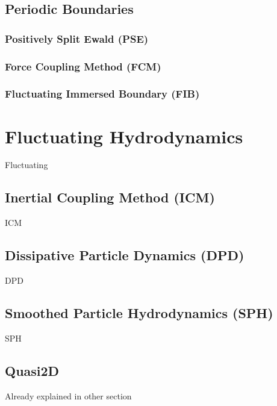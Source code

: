 \section{Periodic Boundaries}

\subsection{Positively Split Ewald (PSE)}

\subsection{Force Coupling Method (FCM)}

\subsection{Fluctuating Immersed Boundary (FIB)}

\chapter{Fluctuating Hydrodynamics}

Fluctuating

\section{Inertial Coupling Method (ICM)}

ICM

\section{Dissipative Particle Dynamics (DPD)}

DPD

\section{Smoothed Particle Hydrodynamics (SPH)}


SPH

\section{Quasi2D}

Already explained in other section

